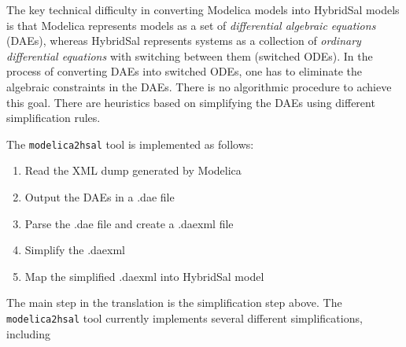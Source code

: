 \documentclass{llncs}
\begin{document}
The key technical difficulty in converting Modelica models into HybridSal models is
that Modelica represents models as a set of {\em{differential algebraic equations}} (DAEs),
whereas HybridSal represents systems as a collection of {\em{ordinary differential equations}}
with switching between them (switched ODEs).
In the process of converting DAEs into switched ODEs, one has to eliminate the
algebraic constraints in the DAEs.
There is no algorithmic procedure to achieve this goal.  There are heuristics 
based on simplifying the DAEs using different simplification rules.

The {\tt{modelica2hsal}} tool is implemented as follows:
\begin{enumerate}
\item  
Read the XML dump generated by Modelica 
\item
Output the DAEs in a .dae file
\item
Parse the .dae file and create a .daexml file
\item
Simplify the .daexml 
\item
Map the simplified .daexml into HybridSal model
\end{enumerate}
The main step in the translation is the simplification step above.
The {\tt{modelica2hsal}} tool currently implements several different
simplifications, including
\end{document}
